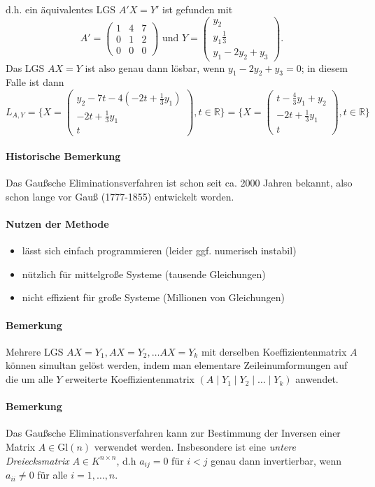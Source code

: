  		d.h. ein äquivalentes LGS $ A'X=Y' $ ist gefunden mit
 		\[
 			A' =
 			\begin{pmatrix}
 				1 & 4 & 7 \\
 				0 & 1 & 2 \\
 				0 & 0 & 0
 			\end{pmatrix}
 			\text{ und }
 			Y =
 			\begin{pmatrix}
 				y_2 \\ y_1\frac{1}{3} \\ y_1-2y_2+y_3
 			\end{pmatrix}
 			.
 		\]
 		Das LGS $ AX=Y $ ist also genau dann lösbar, wenn $ y_1-2y_2+y_3 = 0 $; in diesem Falle ist dann
 		\[
 			L_{A,Y} = \{X =
 			\begin{pmatrix} y_2-7t-4(-2t+\frac{1}{3}y_1)\\-2t+\frac{1}{3}y_1\\t\end{pmatrix}
 			, t\in \mathbb{R}\}
 			= \{X =
 			\begin{pmatrix} t-\frac{4}{3}y_1+y_2\\-2t+\frac{1}{3}y_1\\t\end{pmatrix}
 			, t\in \mathbb{R}\}
 		\]
 	\paragraph{Historische Bemerkung}
 		Das Gaußsche Eliminationsverfahren ist schon seit ca. 2000 Jahren bekannt, also schon lange vor Gauß (1777-1855) entwickelt worden.

 	\paragraph{Nutzen der Methode}
 		\begin{itemize}
 			\item lässt sich einfach programmieren (leider ggf. numerisch instabil)
 			\item nützlich für mittelgroße Systeme (tausende Gleichungen)
 			\item nicht effizient für große Systeme (Millionen von Gleichungen)
 		\end{itemize}
 	\paragraph{Bemerkung}
 		Mehrere LGS $ AX = Y_1, AX = Y_2, \dots AX = Y_k $ mit derselben Koeffizientenmatrix $ A $ können simultan gelöst werden, indem man elementare Zeileinumformungen auf die um alle $ Y $ erweiterte Koeffizientenmatrix $ (A\mid Y_1\mid Y_2\mid \dots \mid Y_k) $ anwendet.
 	\paragraph{Bemerkung}
 		Das Gaußsche Eliminationsverfahren kann zur Bestimmung der Inversen einer Matrix $ A\in \mathrm{Gl}(n) $ verwendet werden. Insbesondere ist eine \emph{untere Dreiecksmatrix} $ A\in K^{n\times n} $, d.h $ a_{ij} = 0 $ für $ i<j $ genau dann invertierbar, wenn $ a_{ii}\neq 0 $ für alle $ i=1,\dots,n $.
